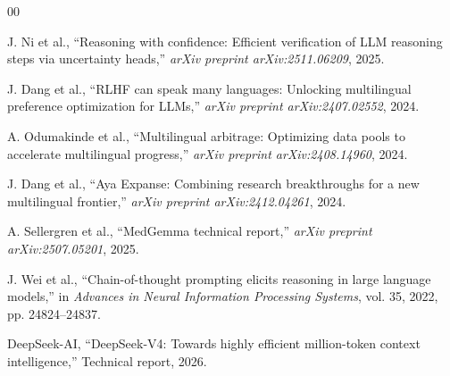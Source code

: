\documentclass[conference,a4paper]{IEEEtran}
\begin{document}
\begin{thebibliography}{00}

J. Ni et al., ``Reasoning with confidence: Efficient verification of LLM reasoning steps via uncertainty heads,'' \emph{arXiv preprint arXiv:2511.06209}, 2025.


J. Dang et al., ``RLHF can speak many languages: Unlocking multilingual preference optimization for LLMs,'' \emph{arXiv preprint arXiv:2407.02552}, 2024.


A. Odumakinde et al., ``Multilingual arbitrage: Optimizing data pools to accelerate multilingual progress,'' \emph{arXiv preprint arXiv:2408.14960}, 2024.


J. Dang et al., ``Aya Expanse: Combining research breakthroughs for a new multilingual frontier,'' \emph{arXiv preprint arXiv:2412.04261}, 2024.


A. Sellergren et al., ``MedGemma technical report,'' \emph{arXiv preprint arXiv:2507.05201}, 2025.


J. Wei et al., ``Chain-of-thought prompting elicits reasoning in large language models,'' in \emph{Advances in Neural Information Processing Systems}, vol. 35, 2022, pp. 24824--24837.


DeepSeek-AI, ``DeepSeek-V4: Towards highly efficient million-token context intelligence,'' Technical report, 2026.

\end{thebibliography}
\end{document}
